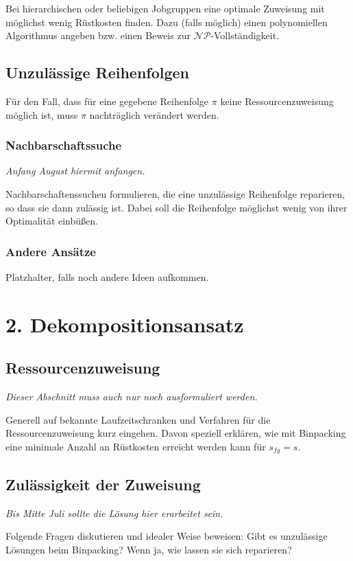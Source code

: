 \documentclass{scrreprt}
\begin{document}
Bei hierarchischen oder beliebigen Jobgruppen eine optimale Zuweisung mit möglichst wenig Rüstkosten finden.
Dazu (falls möglich) einen polynomiellen Algorithmus angeben bzw. einen Beweis zur $\mathcal{NP}$-Vollständigkeit.

\section{Unzulässige Reihenfolgen}
\label{UnzulaessigeReihenfolgen}
Für den Fall, dass für eine gegebene Reihenfolge $\pi$ keine Ressourcenzuweisung möglich ist, muss $\pi$ nachträglich verändert werden.
\subsection{Nachbarschaftssuche}
\textit{Anfang August hiermit anfangen.}

Nachbarschaftenssuchen formulieren, die eine unzulässige Reihenfolge reparieren, so dass sie dann zulässig ist.
Dabei soll die Reihenfolge möglichst wenig von ihrer Optimalität einbüßen.

\subsection{Andere Ansätze}
Platzhalter, falls noch andere Ideen aufkommen.






\chapter{2. Dekompositionsansatz}
\section{Ressourcenzuweisung}
\textit{Dieser Abschnitt muss auch nur noch ausformuliert werden.}

Generell auf bekannte Laufzeitschranken und Verfahren für die Ressourcenzuweisung kurz eingehen.
Davon speziell erklären, wie mit Binpacking eine minimale Anzahl an Rüstkosten erreicht werden kann für $s_{fg}=s$.


\section{Zulässigkeit der Zuweisung}
\textit{Bis Mitte Juli sollte die Lösung hier erarbeitet sein.}

Folgende Fragen diskutieren und idealer Weise beweisen:
Gibt es unzulässige Lösungen beim Binpacking? Wenn ja, wie lassen sie sich reparieren?
\end{document}
